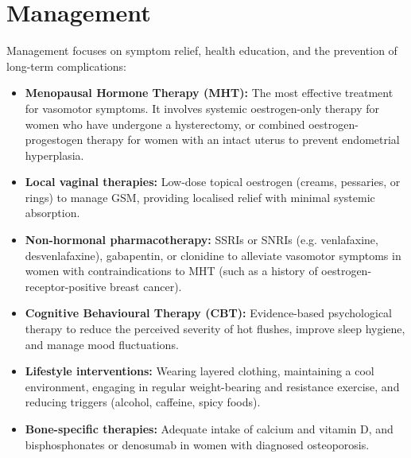 \section*{Management}
Management focuses on symptom relief, health education, and the prevention of long-term complications:
\begin{itemize}
    \item \textbf{Menopausal Hormone Therapy (MHT):} The most effective treatment for vasomotor symptoms. It involves systemic oestrogen-only therapy for women who have undergone a hysterectomy, or combined oestrogen-progestogen therapy for women with an intact uterus to prevent endometrial hyperplasia.
    \item \textbf{Local vaginal therapies:} Low-dose topical oestrogen (creams, pessaries, or rings) to manage GSM, providing localised relief with minimal systemic absorption.
    \item \textbf{Non-hormonal pharmacotherapy:} SSRIs or SNRIs (e.g. venlafaxine, desvenlafaxine), gabapentin, or clonidine to alleviate vasomotor symptoms in women with contraindications to MHT (such as a history of oestrogen-receptor-positive breast cancer).
    \item \textbf{Cognitive Behavioural Therapy (CBT):} Evidence-based psychological therapy to reduce the perceived severity of hot flushes, improve sleep hygiene, and manage mood fluctuations.
    \item \textbf{Lifestyle interventions:} Wearing layered clothing, maintaining a cool environment, engaging in regular weight-bearing and resistance exercise, and reducing triggers (alcohol, caffeine, spicy foods).
    \item \textbf{Bone-specific therapies:} Adequate intake of calcium and vitamin D, and bisphosphonates or denosumab in women with diagnosed osteoporosis.
\end{itemize}

